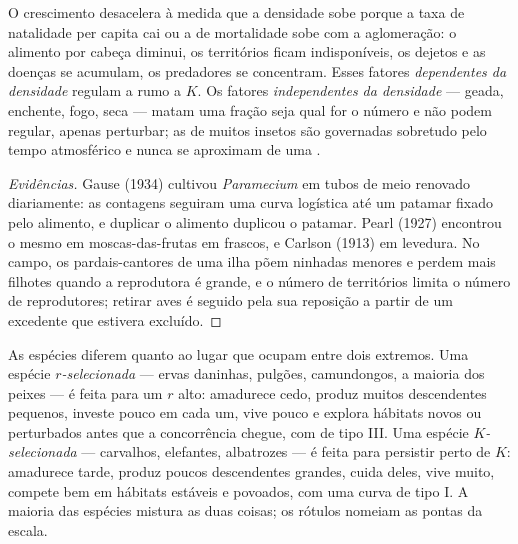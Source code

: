 \begin{proposition}\label{prop:b1:populations:densitydependence}
O crescimento desacelera à medida que a densidade sobe porque a taxa
de natalidade per capita cai ou a de mortalidade sobe com a
aglomeração: o alimento por cabeça diminui, os territórios ficam
indisponíveis, os dejetos e as doenças se acumulam, os predadores se
concentram. Esses fatores \emph{dependentes da densidade} regulam a
 rumo a $K$. Os fatores \emph{independentes da densidade} ---
geada, enchente, fogo, seca --- matam uma fração seja qual for o
número e não podem regular, apenas perturbar; as  de muitos
insetos são governadas sobretudo pelo tempo atmosférico e nunca se
aproximam de uma .
\end{proposition}
\begin{proof}[Evidências]
Gause (1934) cultivou \emph{Paramecium} em tubos de meio renovado
diariamente: as contagens seguiram uma curva logística até um patamar
fixado pelo alimento, e duplicar o alimento duplicou o patamar. Pearl
(1927) encontrou o mesmo em moscas-das-frutas em frascos, e Carlson
(1913) em levedura. No campo, os pardais-cantores de uma ilha põem
ninhadas menores e perdem mais filhotes quando a  reprodutora
é grande, e o número de territórios limita o número de reprodutores;
retirar aves é seguido pela sua reposição a partir de um excedente que
estivera excluído.
\end{proof}

\begin{definition}\label{def:b1:populations:rK}
As espécies diferem quanto ao lugar que ocupam entre dois extremos.
Uma espécie \emph{$r$-selecionada} --- ervas daninhas, pulgões,
camundongos, a maioria dos peixes --- é feita para um $r$ alto:
amadurece cedo, produz muitos descendentes pequenos, investe pouco em
cada um, vive pouco e explora hábitats novos ou perturbados antes que
a concorrência chegue, com  de tipo III. Uma espécie
\emph{$K$-selecionada} --- carvalhos, elefantes, albatrozes --- é feita
para persistir perto de $K$: amadurece tarde, produz poucos
descendentes grandes, cuida deles, vive muito, compete bem em hábitats
estáveis e povoados, com uma curva de tipo I. A maioria das espécies
mistura as duas coisas; os rótulos nomeiam as pontas da escala.
\end{definition}


